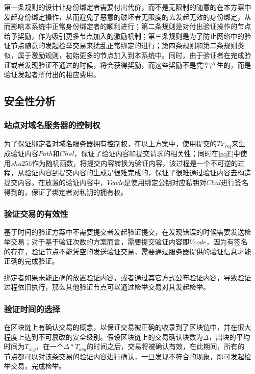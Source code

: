 第一条规则的设计让身份绑定者需要付出代价，而不是无限制的随意的在本方案中发起身份绑定操作，从而避免了恶意的破坏者无限度的去发起无效的身份绑定，从而影响本系统中正常身份绑定者的顺利进行；第二条规则是对付出验证操作的节点给予奖励，作为吸引更多节点加入的激励机制；第三条规则是为了防止网络中的验证节点随意的发起检举交易来扰乱正常绑定的进行；第四条规则和第二条规则类似，属于激励规则，初始更多的节点加入到本系统中。同时，由于验证者在完成验证或者发现验证不通过的时候，将会获得奖励，而这些奖励不是凭空产生的，而是验证发起者所付出的相应费用。


\subsection{安全性分析}

\subsubsection{站点对域名服务器的控制权}

为了保证绑定者对域名服务器拥有控制权，在以上方案中，使用提交的$Tx_{req}$来生成验证内容$Path$和$Chal$，保证了验证内容和提交请求的相关性；同时在\eqref{eqF}中使用$sha256$作为随机函数，将提交内容转换为验证内容，该过程是一个不可逆的过程，从验证内容到提交内容的生成是很难完成的，保证了很难通过验证内容去构造提交内容。在放置的验证内容中，$Vcode$是使用绑定公钥对应私钥对$Chal$进行签名得到的，保证了绑定者对私钥的拥有权。


\subsubsection{验证交易的有效性}

基于时间的验证方案中不需要提交者发起验证提交，在发现错误的时候需要发送检举交易；对于基于验证次数的方案而言，需要提交验证内容即$Vcode$，因为有签名的存在，验证节点不能凭空的发送验证交易，需要通过服务器提供的验证信息才能正确的完成验证。

绑定者如果未能正确的放置验证内容，或者通过其它方式公布验证内容，导致验证过程依旧执行，那么其他验证节点可以通过检举交易对其发起检举。


\subsubsection{验证时间的选择}

在区块链上有确认交易的概念，以保证交易被正确的收录到了区块链中，并在很大程度上达到不可篡改的安全级别\supercite{nakamoto2008bitcoin}。假设区块链上的交易确认块数为$\Delta$，出块的平均时间为$T_{avg}$，在一个$\Delta*T_{avg}$的时间之后，交易将被确认有效，在此期间，所有的节点都可以对该条交易的验证内容进行确认，一旦发现不符合的现象，即可发起检举交易，完成检举。

